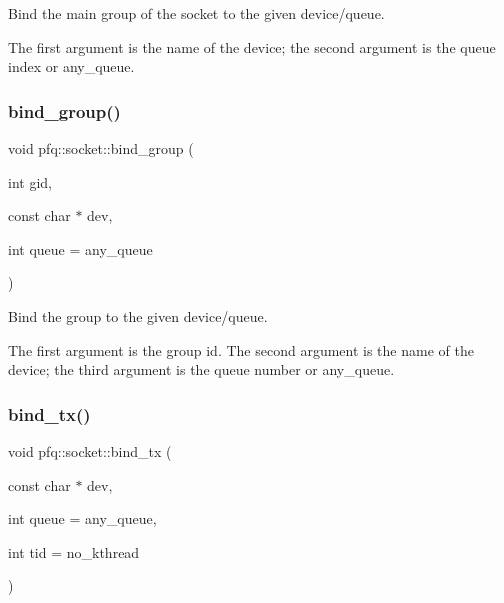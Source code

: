 Bind the main group of the socket to the given device/queue. 

The first argument is the name of the device; the second argument is the queue index or \textquotesingle{}any\+\_\+queue\textquotesingle{}. \mbox{\label{classpfq_1_1socket_a4d4d44cc68af0290e3c494dcd10b1541}} 
\subsubsection{\texorpdfstring{bind\+\_\+group()}{bind\_group()}}
{\footnotesize\ttfamily void pfq\+::socket\+::bind\+\_\+group (\begin{DoxyParamCaption}\item[{int}]{gid,  }\item[{const char $\ast$}]{dev,  }\item[{int}]{queue = {\ttfamily any\+\_\+queue} }\end{DoxyParamCaption})\hspace{0.3cm}{\ttfamily [inline]}}



Bind the group to the given device/queue. 

The first argument is the group id. The second argument is the name of the device; the third argument is the queue number or \textquotesingle{}any\+\_\+queue\textquotesingle{}. \mbox{\label{classpfq_1_1socket_a177de236ffec9f988df80b5c1725ba96}} 
\subsubsection{\texorpdfstring{bind\+\_\+tx()}{bind\_tx()}}
{\footnotesize\ttfamily void pfq\+::socket\+::bind\+\_\+tx (\begin{DoxyParamCaption}\item[{const char $\ast$}]{dev,  }\item[{int}]{queue = {\ttfamily any\+\_\+queue},  }\item[{int}]{tid = {\ttfamily no\+\_\+kthread} }\end{DoxyParamCaption})\hspace{0.3cm}{\ttfamily [inline]}}



